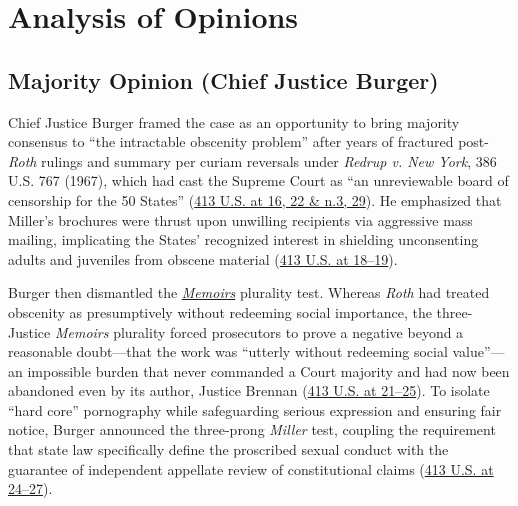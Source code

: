 \documentclass[12pt]{article}
\begin{document}
\section{Analysis of Opinions}

\subsection{Majority Opinion (Chief Justice Burger)}
Chief Justice Burger framed the case as an opportunity to bring majority consensus to ``the intractable obscenity problem'' after years of fractured post-\textit{Roth} rulings and summary per curiam reversals under \textit{Redrup v. New York}, 386 U.S. 767 (1967), which had cast the Supreme Court as ``an unreviewable board of censorship for the 50 States'' (\href{https://supreme.justia.com/cases/federal/us/413/15/}{413 U.S. at 16, 22 \& n.3, 29}). He emphasized that Miller's brochures were thrust upon unwilling recipients via aggressive mass mailing, implicating the States' recognized interest in shielding unconsenting adults and juveniles from obscene material (\href{https://supreme.justia.com/cases/federal/us/413/15/}{413 U.S. at 18--19}).

Burger then dismantled the \href{https://supreme.justia.com/cases/federal/us/383/413/}{\textit{Memoirs}} plurality test. Whereas \textit{Roth} had treated obscenity as presumptively without redeeming social importance, the three-Justice \textit{Memoirs} plurality forced prosecutors to prove a negative beyond a reasonable doubt---that the work was ``utterly without redeeming social value''---an impossible burden that never commanded a Court majority and had now been abandoned even by its author, Justice Brennan (\href{https://supreme.justia.com/cases/federal/us/413/15/}{413 U.S. at 21--25}). To isolate ``hard core'' pornography while safeguarding serious expression and ensuring fair notice, Burger announced the three-prong \textit{Miller} test, coupling the requirement that state law specifically define the proscribed sexual conduct with the guarantee of independent appellate review of constitutional claims (\href{https://supreme.justia.com/cases/federal/us/413/15/}{413 U.S. at 24--27}).
\end{document}
